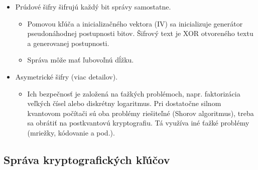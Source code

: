\documentclass[12pt,a4paper]{article}
\begin{document}
{\begin{itemize}
\begin{itemize}
\begin{figure}[htbp]
                \caption{Módy zabezpečujúce len dôvernosť, nie autentickosť.}
                \label{fig:main}
            \end{figure}
            \item Ak správa nie je zarovnaná na násobok veľkosti bloku, je nutné použiť ciphertext stealing, resp. padding. Pri použití paddingu si treba dať pozor, aby sme nevytvorili zraniteľnosť.
        \end{itemize}
        \item Prúdové šifry šifrujú každý bit správy samostatne.
        \begin{itemize}
            \item Pomovou kľúča a inicializačného vektora (IV) sa inicializuje generátor pseudonáhodnej postupnosti bitov. Šifrový text je XOR otvoreného textu a generovanej postupnosti.
            \item Správa môže mať ľubovoľnú dĺžku.
        \end{itemize}
        \item Asymetrické šifry (viac detailov).
        \begin{itemize}
            \item Ich bezpečnosť je založená na ťažkých problémoch, napr. faktorizácia veľkých čísel alebo diskrétny logaritmus. Pri dostatočne silnom kvantovom počítači sú oba problémy riešiteľné (Shorov algoritmus), treba sa obrátiť na postkvantovú kryptografiu. Tá využíva iné ťažké problémy (mriežky, kódovanie a pod.).
        \end{itemize}
    \end{itemize}
    \subsection{Správa kryptografických kľúčov}
}
\end{document}
